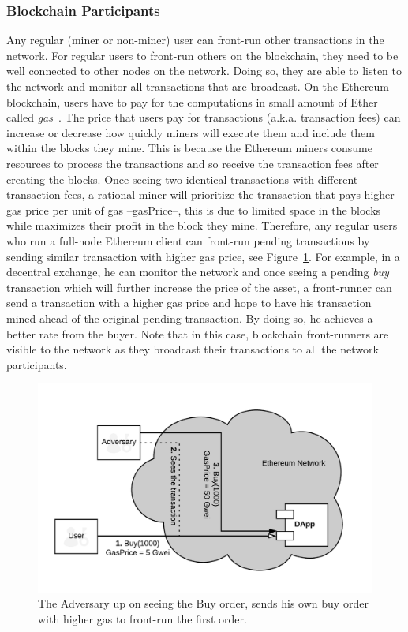 \subsubsection{Blockchain Participants}
Any regular (miner or non-miner) user can front-run other transactions in the network. For regular users to front-run others on the blockchain, they need to be well connected to other nodes on the network. Doing so, they are able to listen to the network and monitor all transactions that are broadcast. On the Ethereum blockchain, users have to pay for the computations in small amount of Ether called \textit{gas}~\cite{AccountT67:online}. The price that users pay for transactions (a.k.a. transaction fees) can increase or decrease how quickly miners will execute them and include them within the blocks they mine. This is because the Ethereum miners consume resources to process the transactions and so receive the transaction fees after creating the blocks. Once seeing two identical transactions with different transaction fees,  a rational miner will prioritize the transaction that pays higher gas price per unit of gas --gasPrice--, this is due to limited space in the blocks while maximizes their profit in the block they mine. Therefore, any regular users who run a full-node Ethereum client can front-run pending transactions by sending similar transaction with higher gas price, see Figure~\ref{fig:RegularFrontrunning}. For example, in a decentral exchange, he can monitor the network and once seeing a pending \textit{buy} transaction which will further increase the price of the asset, a front-runner can send a transaction with a higher gas price and hope to have his transaction mined ahead of the original pending transaction. By doing so, he achieves a better rate from the buyer. Note that in this case, blockchain front-runners are visible to the network as they broadcast their transactions to all the network participants. 

\begin{figure}[h]
\centering
\includegraphics[width=0.7\linewidth]{figures/Regular_frontrunning.png}
\caption{The Adversary up on seeing the Buy order, sends his own buy order with higher gas to front-run the first order. \label{fig:RegularFrontrunning}} 
\end{figure}

